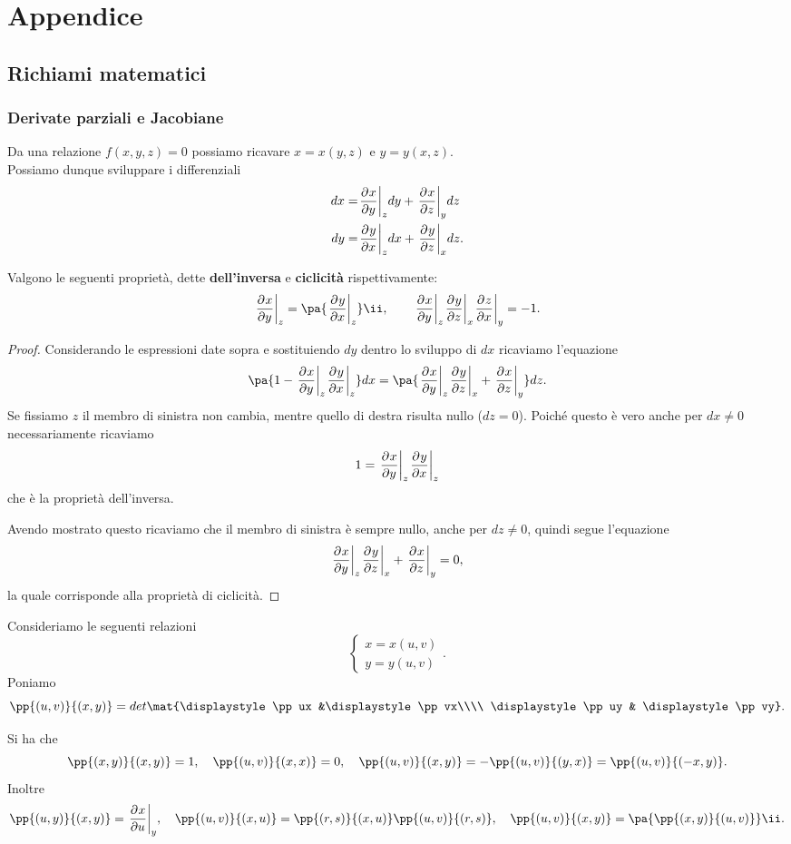 \part{Appendice}
\chapter{Richiami matematici}
\section{Derivate parziali e Jacobiane}
Da una relazione $f(x,y,z)=0$ possiamo ricavare $x=x(y,z)$ e $y=y(x,z)$.\\
Possiamo dunque sviluppare i differenziali
\begin{align*}
dx=&\ppb yxzdy+\ppb zxydz\\
dy=&\ppb xyzdx+\ppb zyxdz.
\end{align*}

\begin{proposition}\label{ProprietaDerivateParziali}
Valgono le seguenti propriet\`a, dette \textbf{dell'inversa} e \textbf{ciclicit\`a} rispettivamente:
\[\ppb yxz=\pa{\ppb xyz}\ii,\qquad \ppb yxz\ppb zyx\ppb xzy=-1.\]
\end{proposition}
\begin{proof}
Considerando le espressioni date sopra e sostituiendo $dy$ dentro lo sviluppo di $dx$ ricaviamo l'equazione
\[\pa{1-\ppb yxz\ppb xyz}dx=\pa{\ppb yxz\ppb zyx+\ppb zxy}dz.\]
Se fissiamo $z$ il membro di sinistra non cambia, mentre quello di destra risulta nullo ($dz=0$). Poich\'e questo \`e vero anche per $dx\neq 0$ necessariamente ricaviamo
\[1=\ppb yxz\ppb xyz\]
che \`e la propriet\`a dell'inversa.\medskip

\noindent Avendo mostrato questo ricaviamo che il membro di sinistra \`e sempre nullo, anche per $dz\neq 0$, quindi segue l'equazione
\[\ppb yxz\ppb zyx+\ppb zxy=0,\]
la quale corrisponde alla propriet\`a di ciclicit\`a.
\end{proof}

\noindent Consideriamo le seguenti relazioni
\[\begin{cases}
x=x(u,v)\\
y=y(u,v)
\end{cases}.\]
Poniamo
\[\pp{(u,v)}{(x,y)}=det{\mat{\displaystyle\pp ux &\displaystyle\pp vx\\\\ \displaystyle\pp uy & \displaystyle\pp vy}}.\]
\begin{remark}\label{JacobianeNotevoli}
Si ha che
\[\pp{(x,y)}{(x,y)}=1,\quad \pp{(u,v)}{(x,x)}=0,\quad \pp{(u,v)}{(x,y)}=-\pp{(u,v)}{(y,x)}=\pp{(u,v)}{(-x,y)}.\]
Inoltre
\[\pp{(u,y)}{(x,y)}=\ppb uxy,\quad \pp{(u,v)}{(x,u)}=\pp{(r,s)}{(x,u)}\pp{(u,v)}{(r,s)},\quad \pp{(u,v)}{(x,y)}=\pa{\pp{(x,y)}{(u,v)}}\ii.\]
\end{remark}


